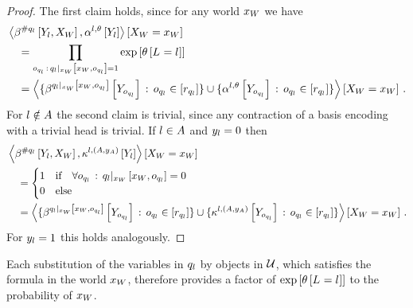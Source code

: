 \begin{proof}
    The first claim holds, since for any world $x_{W}$ we have
    \begin{align*}
        &\left\langle \beta^{\#q_{l}}\left[Y_{l},X_{W}\right],\alpha^{l,\theta}\left[Y_{l}\right]\right\rangle \left[ X_{W}=x_{W} \right] \\
        &\quad = \prod_{o_{q_{l}}\,:\,{q_{l}}|_{x_{W}} \left[x_{W},o_{q_{l}}\right]=1} \mathrm{exp}\left[\theta\left[L_{}=l_{}\right]\right] \\
        &\quad = \left\langle 
            \{\beta^{{q_{l}}|_{x_{W}} \left[x_{W},o_{q_{l}}\right]}\left[Y_{o_{q_{l}}}\right] \,:\, o_{q_{l}}\in[r_{q_{l}}]\}
            \cup
            \{\alpha^{l,\theta}\left[Y_{o_{q_{l}}}\right] \,:\, o_{q_{l}}\in[r_{q_{l}}]\}
        \right\rangle \left[ X_{W}=x_{W} \right] \, .
    \end{align*}
    For $l\notin A$ the second claim is trivial, since any contraction of a basis encoding with a trivial head is trivial.
    If $l\in A$ and $y_{l}=0$ then
    \begin{align*}
        &\left\langle \beta^{\#q_{l}}\left[Y_{l},X_{W}\right],\kappa^{l,(A,y_{A})}\left[Y_{l}\right]\right\rangle \left[ X_{W}=x_{W} \right] \\
        &\quad=
        \begin{cases}
            1 & \text{if}\quad \forall o_{q_{l}} \,:\,  {q_{l}}|_{x_{W}} \left[x_{W},o_{q_{l}}\right] = 0\\
            0 & \text{else}
        \end{cases} \\
        &\quad= \left\langle 
            \{\beta^{{q_{l}}|_{x_{W}} \left[x_{W},o_{q_{l}}\right]}\left[Y_{o_{q_{l}}}\right] \,:\, o_{q_{l}}\in[r_{q_{l}}]\}
            \cup
            \{\kappa^{l,(A,y_{A})}\left[Y_{o_{q_{l}}}\right] \,:\, o_{q_{l}}\in[r_{q_{l}}]\}
        \right\rangle \left[ X_{W}=x_{W} \right] \, .
    \end{align*}
    For $y_{l}=1$ this holds analogously.
\end{proof}

Each substitution of the variables in $q_{l}$ by objects in $\mathcal{U}$, which satisfies the formula in the world $x_{W}$, therefore provides a factor of $\mathrm{exp}\left[\theta\left[L_{}=l_{}\right]\right]$ to the probability of $x_{W}$.



